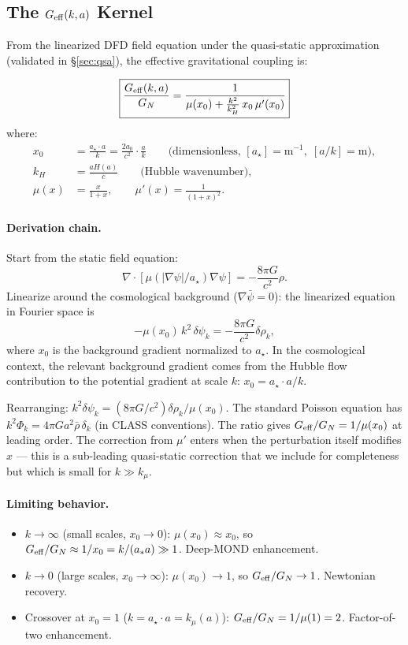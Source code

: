 \documentclass[11pt]{article}
\theoremstyle{definition}
\theoremstyle{remark}
\newcommand{\Geff}{G_{\rm eff}}
\newcommand{\kmu}{k_\mu}
\newcommand{\astar}{a_\star}
\newcommand{\dpsi}{\delta\psi}
\begin{document}
\subsection{The $\Geff(k,a)$ Kernel}

From the linearized DFD field equation under the quasi-static
approximation (validated in \S\ref{sec:qsa}), the effective
gravitational coupling is:

\begin{equation}
\boxed{
\frac{\Geff(k,a)}{G_N} = \frac{1}{\mu(x_0) + \frac{k^2}{k_H^2}\,x_0\,\mu'(x_0)}
}
\label{eq:Geff}
\end{equation}
where:
\begin{align}
x_0 &= \frac{\astar \cdot a}{k} = \frac{2a_0}{c^2}\cdot\frac{a}{k}
  \qquad\text{(dimensionless, } [\astar] = \text{m}^{-1},\;
  [a/k] = \text{m)},
  \label{eq:x0}\\
k_H &= \frac{aH(a)}{c} \qquad\text{(Hubble wavenumber)},\\
\mu(x) &= \frac{x}{1+x}, \qquad
\mu'(x) = \frac{1}{(1+x)^2}.
\end{align}

\paragraph{Derivation chain.}
Start from the static field equation:
\[
\nabla\cdot[\mu(|\nabla\psi|/\astar)\nabla\psi] = -\frac{8\pi G}{c^2}\rho.
\]
Linearize around the cosmological background ($\nabla\bar\psi = 0$):
the linearized equation in Fourier space is
\[
-\mu(x_0)\,k^2\,\dpsi_k = -\frac{8\pi G}{c^2}\delta\rho_k,
\]
where $x_0$ is the background gradient normalized to $\astar$.
In the cosmological context, the relevant background gradient
comes from the Hubble flow contribution to the potential gradient
at scale $k$: $x_0 = \astar\cdot a/k$.

Rearranging: $k^2\dpsi_k = (8\pi G/c^2)\delta\rho_k / \mu(x_0)$.
The standard Poisson equation has $k^2\Phi_k = 4\pi G a^2 \bar\rho\,\delta_k$
(in CLASS conventions). The ratio gives $\Geff/G_N = 1/\mu(x_0)$
at leading order. The correction from $\mu'$ enters when the
perturbation itself modifies $x$ --- this is a sub-leading quasi-static
correction that we include for completeness but which is small
for $k \gg k_\mu$.

\paragraph{Limiting behavior.}
\begin{itemize}
\item $k \to \infty$ (small scales, $x_0 \to 0$):
  $\mu(x_0) \approx x_0$, so $\Geff/G_N \approx 1/x_0
  = k/(a_* a) \gg 1$. Deep-MOND enhancement.
\item $k \to 0$ (large scales, $x_0 \to \infty$):
  $\mu(x_0) \to 1$, so $\Geff/G_N \to 1$. Newtonian recovery.
\item Crossover at $x_0 = 1$ ($k = \astar\cdot a = \kmu(a)$):
  $\Geff/G_N = 1/\mu(1) = 2$. Factor-of-two enhancement.
\end{itemize}
\end{document}

